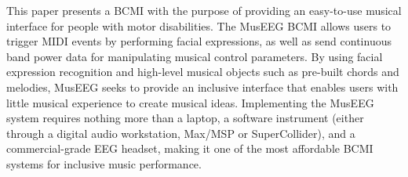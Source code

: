 This paper presents a BCMI with the purpose of providing an easy-to-use musical interface for people with motor disabilities. The MusEEG BCMI allows users to trigger MIDI events by performing facial expressions, as well as send continuous band power data for manipulating musical control parameters. By using facial expression recognition and high-level musical objects such as pre-built chords and melodies, MusEEG seeks to provide an inclusive interface that enables users with little musical experience to create musical ideas. Implementing the MusEEG system requires nothing more than a laptop, a software instrument (either through a digital audio workstation, Max/MSP or SuperCollider), and a commercial-grade EEG headset, making it one of the most affordable BCMI systems for inclusive music performance. 
